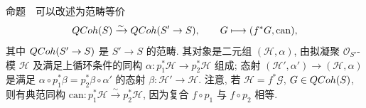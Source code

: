 命题~~可以改述为范畴等价
\begin{equation}\label{src:3.1.5}
QCoh(S)\xrightarrow{\sim}QCoh(S'\to S),
\qquad G\longmapsto(f^*G,\mathrm{can}),
\end{equation}
其中 $QCoh(S'\to S)$ 是 $S'\to S$ 的范畴. 其对象是二元组 $(\mathcal H,\alpha)$, 由拟凝聚 $\mathcal O_{S'}$-模 $\mathcal H$ 及满足上循环条件的同构 $\alpha:p_1^*\mathcal H\to p_2^*\mathcal H$ 组成; 态射 $(\mathcal H',\alpha')\to(\mathcal H,\alpha)$ 是满足 $\alpha\circ p_1^*\beta=p_2^*\beta\circ\alpha'$ 的态射 $\beta:\mathcal H'\to\mathcal H$. 注意, 若 $\mathcal H=f^*\mathcal G$, $G\in QCoh(S)$, 则有典范同构 $\mathrm{can}:p_1^*\mathcal H\xrightarrow{\sim}p_2^*\mathcal H$, 因为复合 $f\circ p_1$ 与 $f\circ p_2$ 相等.


